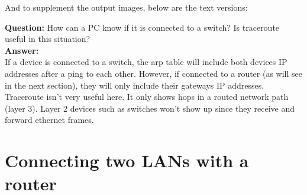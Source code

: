 \documentclass[11pt,a4paper]{report}
\begin{document}
        And to supplement the output images, below are the text versions:
        \lstset{style=termoutputs}
        
        

        \textbf{Question:} How can a PC know if it is connected to a switch? Is traceroute useful in this situation? \\
        \textbf{Answer:}\\
        \hspace*{10mm}If a device is connected to a switch, the arp table will include both devices IP addresses after a ping to each other. However, if connected to a router (as will see in the next section), they will only include their gateways IP addresses.\\
        \hspace*{10mm}Traceroute isn't very useful here. It only shows hops in a routed network path (layer 3). Layer 2 devices such as switches won't show up since they receive and forward ethernet frames.\\

    \section{Connecting two LANs with a router}
        
\end{document}
